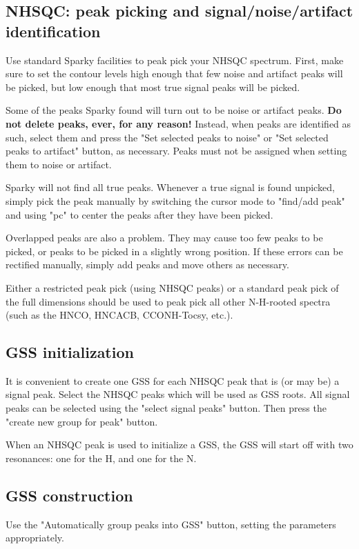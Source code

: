 
\subsection{NHSQC: peak picking and signal/noise/artifact identification}
Use standard Sparky facilities to peak pick your NHSQC spectrum.
First, make sure to set the contour levels high enough that few noise and 
artifact peaks will be picked, but low enough that most true signal peaks
will be picked.

Some of the peaks Sparky found will turn out to be noise or artifact peaks.
\textbf{Do not delete peaks, ever, for any reason!}  Instead,
when peaks are identified as such, select them and press the "Set selected 
peaks to noise" or "Set selected peaks to artifact" button, as necessary.
Peaks must not be assigned when setting them to noise or artifact.

Sparky will not find all true peaks.  Whenever a true signal is found 
unpicked, simply pick the peak manually by switching the cursor mode to 
"find/add peak" and using "pc" to center the peaks after they have been
picked.

Overlapped peaks are also a problem.  They may cause too few peaks to be 
picked, or peaks to be picked in a slightly wrong position.  If these errors
can be rectified manually, simply add peaks and move others as necessary.

Either a restricted peak pick (using NHSQC peaks) or a standard peak pick
of the full dimensions should be used to peak pick all other N-H-rooted
spectra (such as the HNCO, HNCACB, CCONH-Tocsy, etc.).

\subsection{GSS initialization}
It is convenient to create one GSS for each NHSQC peak that is (or may be)
a signal peak.  Select the NHSQC peaks which will be used as GSS roots.  
All signal peaks can be selected using the "select signal peaks" button.
Then press the "create new group for peak" button.

When an NHSQC peak is used to initialize a GSS, the GSS will start off
with two resonances: one for the H, and one for the N.

\subsection{GSS construction}
Use the "Automatically group peaks into GSS" button, setting the parameters
appropriately.

